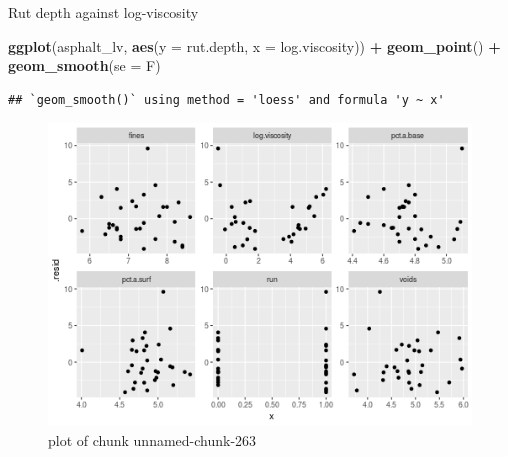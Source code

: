 \documentclass[ignorenonframetext,]{beamer}
\newenvironment{Shaded}{\begin{snugshade}}{\end{snugshade}}
\newcommand{\DataTypeTok}[1]{\textcolor[rgb]{0.13,0.29,0.53}{#1}}
\newcommand{\KeywordTok}[1]{\textcolor[rgb]{0.13,0.29,0.53}{\textbf{#1}}}
\newcommand{\NormalTok}[1]{#1}
\newcommand{\OperatorTok}[1]{\textcolor[rgb]{0.81,0.36,0.00}{\textbf{#1}}}
\newcommand{\StringTok}[1]{\textcolor[rgb]{0.31,0.60,0.02}{#1}}
\begin{document}
\begin{frame}[fragile]{Rut depth against log-viscosity}
\protect\hypertarget{rut-depth-against-log-viscosity}{}

\begin{Shaded}
\begin{Highlighting}[]
\KeywordTok{ggplot}\NormalTok{(asphalt_lv, }\KeywordTok{aes}\NormalTok{(}\DataTypeTok{y =}\NormalTok{ rut.depth, }\DataTypeTok{x =}\NormalTok{ log.viscosity)) }\OperatorTok{+}
\StringTok{  }\KeywordTok{geom_point}\NormalTok{() }\OperatorTok{+}\StringTok{ }\KeywordTok{geom_smooth}\NormalTok{(}\DataTypeTok{se =}\NormalTok{ F)}
\end{Highlighting}
\end{Shaded}

\begin{verbatim}
## `geom_smooth()` using method = 'loess' and formula 'y ~ x'
\end{verbatim}

\begin{figure}
\centering
\includegraphics{figure/unnamed-chunk-263-1.png}
\caption{plot of chunk unnamed-chunk-263}
\end{figure}

\end{frame}
\end{document}
